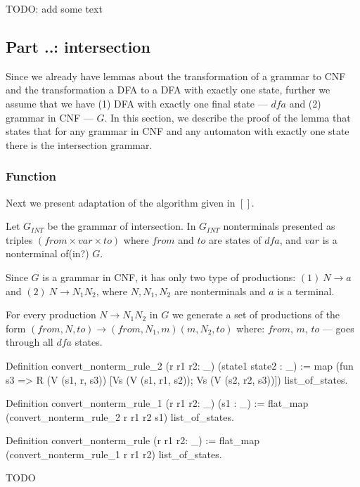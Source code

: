 





TODO: add some text



\subsection{Part ..: intersection}

Since we already have lemmas about the transformation of a grammar to CNF and the transformation a DFA to a DFA with exactly one state, further we assume that we have (1) DFA with exactly one final state --- $dfa$ and (2) grammar in CNF --- $G$. In this section, we describe the proof of the lemma that states that for any grammar in CNF and any automaton with exactly one state there is the intersection grammar.

\subsubsection{Function }

Next we present adaptation of the algorithm given in $[ ]$. 

Let $G_{INT}$ be the grammar of intersection. In $G_{INT}$ nonterminals presented as triples $(from \times var \times to) $ where $from$ and $to$ are states of $dfa$, and $var$ is a nonterminal of(in?) $G$.

Since $G$ is a grammar in CNF, it has only two type of productions: $(1)\ N \to a $ and $(2) \ N \to N_{1} N_{2}$, where $N, N_1, N_2$ are nonterminals and $a$ is a terminal.

For every production $N \to N_1 N_2$ in $G$ we generate a set of productions of the form $(from, N, to) \to (from, N_1,  m) (m, N_2, to)$ where: $from$, $m$, $to$ --- goes through all $dfa$ states.

\begin{listing}[h]
    \begin{pyglist}[language=coq, numbers=none, numbersep=5pt]
  Definition convert_nonterm_rule_2 
    (r r1 r2: _) 
    (state1 state2 : _) :=
    map (fun s3 => R (V (s1, r, s3)) 
                     [Vs (V (s1, r1, s2)); 
                      Vs (V (s2, r2, s3))])
      list_of_states.

  Definition convert_nonterm_rule_1  
               (r r1 r2: _) 
               (s1 : _) :=
    flat_map (convert_nonterm_rule_2 r r1 r2 s1) 
             list_of_states.

  Definition convert_nonterm_rule (r r1 r2: _) :=
    flat_map (convert_nonterm_rule_1 r r1 r2) 
             list_of_states.
    \end{pyglist}
    \caption{TODO}
    \label{lst:verbments1}
\end{listing}

